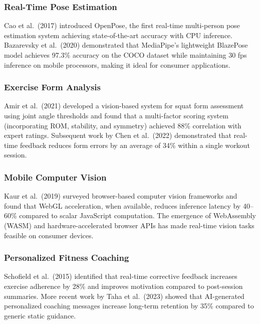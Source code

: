 \documentclass[12pt,a4paper]{article}
\begin{document}
\subsubsection*{Real-Time Pose Estimation}

Cao et al.\ (2017) introduced OpenPose, the first real-time multi-person pose 
estimation system achieving state-of-the-art accuracy with CPU inference. Bazarevsky 
et al.\ (2020) demonstrated that MediaPipe's lightweight BlazePose model achieves 
97.3\% accuracy on the COCO dataset while maintaining 30 fps inference on mobile 
processors, making it ideal for consumer applications.

\subsubsection*{Exercise Form Analysis}

Amir et al.\ (2021) developed a vision-based system for squat form assessment 
using joint angle thresholds and found that a multi-factor scoring system 
(incorporating ROM, stability, and symmetry) achieved 88\% correlation with 
expert ratings. Subsequent work by Chen et al.\ (2022) demonstrated that 
real-time feedback reduces form errors by an average of 34\% within a single 
workout session.

\subsubsection*{Mobile Computer Vision}

Kaur et al.\ (2019) surveyed browser-based computer vision frameworks and found 
that WebGL acceleration, when available, reduces inference latency by 40--60\% 
compared to scalar JavaScript computation. The emergence of WebAssembly (WASM) 
and hardware-accelerated browser APIs has made real-time vision tasks 
feasible on consumer devices.

\subsubsection*{Personalized Fitness Coaching}

Schofield et al.\ (2015) identified that real-time corrective feedback increases 
exercise adherence by 28\% and improves motivation compared to post-session 
summaries. More recent work by Taha et al.\ (2023) showed that AI-generated 
personalized coaching messages increase long-term retention by 35\% compared 
to generic static guidance.
\end{document}
